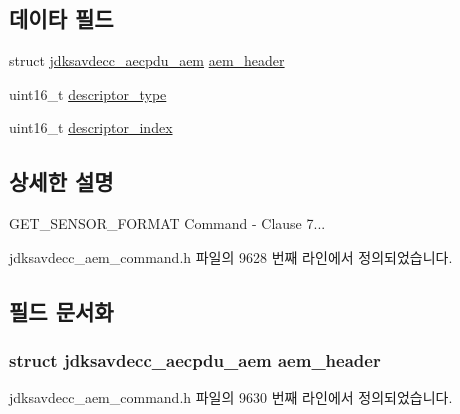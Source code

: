 \subsection*{데이타 필드}
\begin{DoxyCompactItemize}
\item 
struct \hyperlink{structjdksavdecc__aecpdu__aem}{jdksavdecc\+\_\+aecpdu\+\_\+aem} \hyperlink{structjdksavdecc__aem__command__get__sensor__format_ae1e77ccb75ff5021ad923221eab38294}{aem\+\_\+header}
\item 
uint16\+\_\+t \hyperlink{structjdksavdecc__aem__command__get__sensor__format_ab7c32b6c7131c13d4ea3b7ee2f09b78d}{descriptor\+\_\+type}
\item 
uint16\+\_\+t \hyperlink{structjdksavdecc__aem__command__get__sensor__format_a042bbc76d835b82d27c1932431ee38d4}{descriptor\+\_\+index}
\end{DoxyCompactItemize}


\subsection{상세한 설명}
G\+E\+T\+\_\+\+S\+E\+N\+S\+O\+R\+\_\+\+F\+O\+R\+M\+AT Command -\/ Clause 7... 

jdksavdecc\+\_\+aem\+\_\+command.\+h 파일의 9628 번째 라인에서 정의되었습니다.



\subsection{필드 문서화}
\subsubsection[{\texorpdfstring{aem\+\_\+header}{aem_header}}]{\setlength{\rightskip}{0pt plus 5cm}struct {\bf jdksavdecc\+\_\+aecpdu\+\_\+aem} aem\+\_\+header}\hypertarget{structjdksavdecc__aem__command__get__sensor__format_ae1e77ccb75ff5021ad923221eab38294}{}\label{structjdksavdecc__aem__command__get__sensor__format_ae1e77ccb75ff5021ad923221eab38294}


jdksavdecc\+\_\+aem\+\_\+command.\+h 파일의 9630 번째 라인에서 정의되었습니다.

